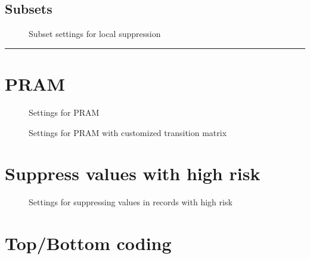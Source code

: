 \documentclass[letterpaper,10pt,english]{sphinxmanual}
\begin{document}
\subsection{Subsets}
\label{\detokenize{anon:subsets}}
\begin{figure}[htbp]
\centering
\capstart

\noindent{}
\caption{Subset settings for local suppression}\label{\detokenize{anon:fig85}}\label{\detokenize{anon:id5}}\end{figure}


\bigskip\hrule\bigskip



\section{PRAM}
\label{\detokenize{anon:pram}}
\begin{figure}[htbp]
\centering
\capstart

\noindent{}
\caption{Settings for PRAM}\label{\detokenize{anon:fig86}}\label{\detokenize{anon:id6}}\end{figure}

\begin{figure}[htbp]
\centering
\capstart

\noindent{}
\caption{Settings for PRAM with customized transition matrix}\label{\detokenize{anon:fig87}}\label{\detokenize{anon:id7}}\end{figure}


\section{Suppress values with high risk}
\label{\detokenize{anon:suppress-values-with-high-risk}}
\begin{figure}[htbp]
\centering
\capstart

\noindent{}
\caption{Settings for suppressing values in records with high risk}\label{\detokenize{anon:fig88}}\label{\detokenize{anon:id8}}\end{figure}


\section{Top/Bottom coding}
\label{\detokenize{anon:top-bottom-coding}}
\end{document}

